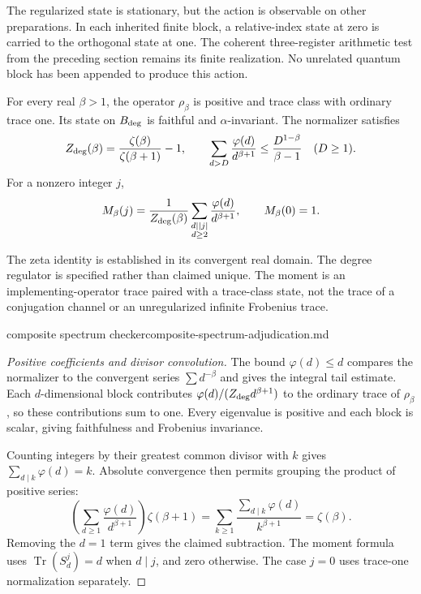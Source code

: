 The regularized state is stationary, but the action is observable on
other preparations. In each inherited finite block, a relative-index
state at zero is carried to the orthogonal state at one. The coherent
three-register arithmetic test from the preceding section remains its
finite realization. No unrelated quantum block has been appended to
produce this action.

\begin{theorem}
\statusSketch\quad
For every real $\beta>1$, the operator $\rho_\beta$ is positive and trace
class with ordinary trace one. Its state on $B_{\rm deg}$ is faithful
and $\alpha$-invariant. The normalizer satisfies
\[
 Z_{\rm deg}(\beta)=\frac{\zeta(\beta)}{\zeta(\beta+1)}-1,
 \qquad
 \sum_{d>D}\frac{\varphi(d)}{d^{\beta+1}}
       \leq\frac{D^{1-\beta}}{\beta-1}\quad(D\geq1).
\]
For a nonzero integer $j$,
\[
 M_\beta(j)=\frac1{Z_{\rm deg}(\beta)}
       \sum_{\substack{d\mid |j|\\d\geq2}}
              \frac{\varphi(d)}{d^{\beta+1}},
 \qquad M_\beta(0)=1.
\]
\end{theorem}
\begin{scope}
The zeta identity is established in its convergent real domain. The
degree regulator is specified rather than claimed unique. The moment is
an implementing-operator trace paired with a trace-class state, not the
trace of a conjugation channel or an unregularized infinite Frobenius trace.
\end{scope}
{composite spectrum checker}{composite-spectrum-adjudication.md}

\begin{proof}[Positive coefficients and divisor convolution]
The bound $\varphi(d)\leq d$ compares the normalizer to the convergent
series $\sum d^{-\beta}$ and gives the integral tail estimate. Each
$d$-dimensional block contributes $\varphi(d)/(Z_{\rm deg}d^{\beta+1})$
to the ordinary trace of $\rho_\beta$, so these contributions sum to one.
Every eigenvalue is positive and each block is scalar, giving faithfulness
and Frobenius invariance.

Counting integers by their greatest common divisor with $k$ gives
$\sum_{d\mid k}\varphi(d)=k$. Absolute convergence then permits grouping
the product of positive series:
\[
 \left(\sum_{d\geq1}\frac{\varphi(d)}{d^{\beta+1}}\right)
 \zeta(\beta+1)
 =\sum_{k\geq1}\frac{\sum_{d\mid k}\varphi(d)}{k^{\beta+1}}
 =\zeta(\beta).
\]
Removing the $d=1$ term gives the claimed subtraction. The moment formula
uses $\operatorname{Tr}(S_d^j)=d$ when $d\mid j$, and zero otherwise.
The case $j=0$ uses trace-one normalization separately.
\end{proof}

